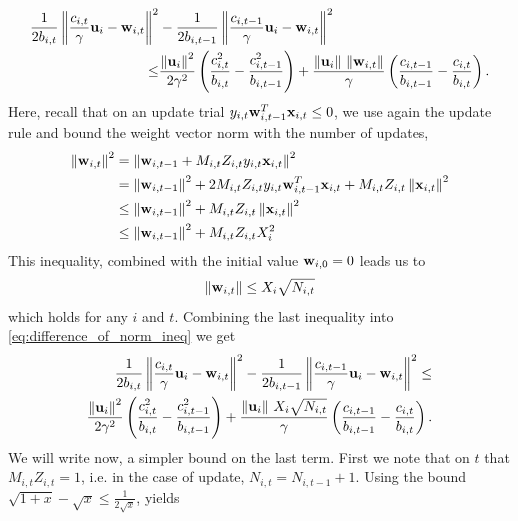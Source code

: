 \begin{equation}
\begin{split}
\frac{1}{2b_{i,t}}\left\Vert {\frac{c_{i,t}}{\gamma} \mathbf{u}_i-\mathbf{w}_{i,t}} \right\Vert^2&-\frac{1}{2b_{i,t-1}}\left\Vert {\frac{c_{i,t-1}}{\gamma} \mathbf{u}_i-\mathbf{w}_{i,t}} \right\Vert^2\\
\le&\frac{\left\Vert {\mathbf{u}_i} \right\Vert^2}{2\gamma^2}\left({\frac{c_{i,t}^2}{b_{i,t}}-\frac{c_{i,t-1}^2}{b_{i,t-1}}}\right)+
\frac{\Vert\mathbf{u}_i\Vert~\Vert\mathbf{w}_{i,t}\Vert}{\gamma}\left({\frac{c_{i,t-1}}{b_{i,t-1}}-\frac{c_{i,t}}{b_{i,t}}}\right).
\end{split}
\label{eq:difference_of_norm_ineq}
\end{equation}
Here, recall that on an update trial $y_{i,t}\mathbf{w}_{i,t-1}^{T}\mathbf{x}_{i,t}\le0$, we use again the update rule and  bound the weight vector norm with the number of updates, 
\begin{equation*}
\begin{split}
\left\Vert {\mathbf{w}_{i,t}} \right\Vert^2&=\left\Vert {\mathbf{w}_{i,t-1}+M_{i,t}Z_{i,t}y_{i,t}\mathbf{x}_{i,t}} \right\Vert^2\\
&=\left\Vert {\mathbf{w}_{i,t-1}} \right\Vert^2+ 2M_{i,t}Z_{i,t}y_{i,t}\mathbf{w}_{i,t-1}^{T}\mathbf{x}_{i,t}+M_{i,t}Z_{i,t}\left\Vert {\mathbf{x}_{i,t}} \right\Vert^2\\
&\le\left\Vert {\mathbf{w}_{i,t-1}} \right\Vert^2+M_{i,t}Z_{i,t}\left\Vert {\mathbf{x}_{i,t}} \right\Vert^2\\
&\le\left\Vert {\mathbf{w}_{i,t-1}} \right\Vert^2+M_{i,t}Z_{i,t}X_i^2
\end{split}
\end{equation*}
This inequality, combined with the initial value $\mathbf{w}_{i,0}=0$ leads us to
\begin{equation}
\Vert\mathbf{w}_{i,t}\Vert\le X_i\sqrt{N_{i,t}}
\label{eq:bound_on_w}
\end{equation}
which holds for any $i$ and $t$. Combining the last inequality into   \eqref{eq:difference_of_norm_ineq} we get
\begin{equation}
\begin{split}
\frac{1}{2b_{i,t}}\left\Vert {\frac{c_{i,t}}{\gamma} \mathbf{u}_i-\mathbf{w}_{i,t}} \right\Vert^2-\frac{1}{2b_{i,t-1}}\left\Vert {\frac{c_{i,t-1}}{\gamma} \mathbf{u}_i-\mathbf{w}_{i,t}} \right\Vert^2\le\\
\frac{\left\Vert {\mathbf{u}_i} \right\Vert^2}{2\gamma^2}\left({\frac{c_{i,t}^2}{b_{i,t}}-\frac{c_{i,t-1}^2}{b_{i,t-1}}}\right)+
\frac{\Vert\mathbf{u}_i\Vert~ X_i\sqrt{ N_{i,t}}}{\gamma}\left({\frac{c_{i,t-1}}{b_{i,t-1}}-\frac{c_{i,t}}{b_{i,t}}}\right).
\label{eq:difference_of_norm_ineq_2}
\end{split}
\end{equation}
We will write now, a simpler bound on the last term. First we note that on $t$ that $M_{i,t}Z_{i,t}=1$, i.e. in the case of update, $N_{i,t}=N_{i,t-1}+1$. Using the bound $\sqrt{1+x}-\sqrt{x}\le\frac{1}{2\sqrt{x}}$, yields 

